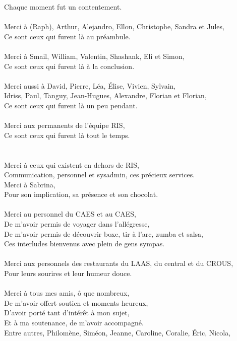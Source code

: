 \documentclass[english,a4paper,11pt,twoside]{StyleThese}
\begin{document}
Chaque moment fut un contentement.\\
\\
Merci à (Raph), Arthur, Alejandro, Ellon, Christophe, Sandra et Jules,\\
Ce sont ceux qui furent là au préambule.\\
\\
Merci à Smail, William, Valentin, Shashank, Eli et Simon,\\
Ce sont ceux qui furent là à la conclusion.\\
\\
Merci aussi à David, Pierre, Léa, Élise, Vivien, Sylvain,\\
Idriss, Paul, Tanguy, Jean-Hugues, Alexandre, Florian et Florian,\\
Ce sont ceux qui furent là un peu pendant.\\
\\
Merci aux permanents de l'équipe RIS,\\
Ce sont ceux qui furent là tout le temps.\\
\\
\\
Merci à ceux qui existent en dehors de RIS,\\
Communication, personnel et sysadmin, ces précieux services.\\
Merci à Sabrina,\\
Pour son implication, sa présence et son chocolat.\\
\\
Merci au personnel du CAES et au CAES,\\
De m'avoir permis de voyager dans l'allégresse,\\
De m'avoir permis de découvrir boxe, tir à l'arc, zumba et salsa,\\
Ces interludes bienvenus avec plein de gens sympas.\\
\\
Merci aux personnels des restaurants du LAAS, du central et du CROUS,\\
Pour leurs sourires et leur humeur douce.\\
\\
Merci à tous mes amis, ô que nombreux,\\
De m'avoir offert soutien et moments heureux,\\
D'avoir porté tant d'intérêt à mon sujet,\\
Et à ma soutenance, de m'avoir accompagné.\\
Entre autres, Philomène, Siméon, Jeanne, Caroline, Coralie, Éric, Nicola,\\
\end{document}
